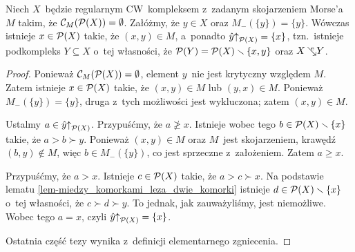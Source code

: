 \begin{lem}\label{lem-374}
Niech $X$~będzie regularnym CW~kompleksem z~zadanym skojarzeniem Morse'a $M$ takim, że $\mathcal{C}_M(\mathcal{P}(X))=\emptyset$. Załóżmy, że $y\in X$ oraz $M_{-}(\{y\})=\{y\}$. Wówczas istnieje $x\in \mathcal{P}(X)$ takie, że $(x,y)\in M$, a~ponadto $\hat{y}\mathord{\uparrow}_{\mathcal{P}(X)}=\{x\}$, tzn.~istnieje podkompleks $Y\subseteq X$ o~tej własności, że $\mathcal{P}(Y)=\mathcal{P}(X)\smallsetminus\{x,y\}$ oraz $X\mbox{$\hspace{2pt}\searrow\hspace{-9pt}^\mathrm{e}\hspace{2pt}$} Y$.
\end{lem}
\begin{proof}
Ponieważ $\mathcal{C}_M(\mathcal{P}(X))=\emptyset$, element $y$~nie jest krytyczny względem $M$. Zatem istnieje $x\in\mathcal{P}(X)$ takie, że $(x,y)\in M$ lub $(y,x)\in M$. Ponieważ $M_{-}(\{y\})=\{y\}$, druga z~tych możliwości jest wykluczona; zatem $(x,y)\in M$.

Ustalmy $a\in \hat{y}\mathord{\uparrow}_{\mathcal{P}(X)}$. Przypuśćmy, że $a\not\geq x$. Istnieje wobec tego \mbox{$b\in \mathcal{P}(X)\smallsetminus \{x\}$} takie, że $a>b\succ y$. Ponieważ $(x,y)\in M$ oraz $M$~jest skojarzeniem, krawędź $(b,y)\not\in M$, więc $b\in M_{-}(\{y\})$, co jest sprzeczne z~założeniem. Zatem $a\geq x$.

Przypuśćmy, że $a>x$. Istnieje $c\in \mathcal{P}(X)$ takie, że $a> c\succ x$. Na podstawie lematu \ref{lem-miedzy_komorkami_leza_dwie_komorki} istnieje $d\in\mathcal{P}(X)\smallsetminus\{x\}$ o~tej własności, że $c\succ d\succ y$. To jednak, jak zauważyliśmy, jest niemożliwe. Wobec tego $a=x$, czyli $\hat{y}\mathord{\uparrow}_{\mathcal{P}(X)}=\{x\}$.

Ostatnia część tezy wynika z~definicji elementarnego zgniecenia.
\end{proof}



